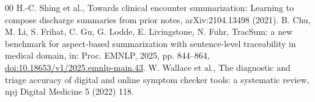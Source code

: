 \documentclass[preprint,12pt,a4paper]{elsarticle}
\begin{document}
\begin{thebibliography}{00}
 H.-C. Shing et al., Towards clinical encounter summarization: Learning to compose discharge summaries from prior notes, arXiv:2104.13498 (2021).
 B. Chu, M. Li, S. Frihat, C. Gu, G. Lodde, E. Livingstone, N. Fuhr, TracSum: a new benchmark for aspect-based summarization with sentence-level traceability in medical domain, in: Proc. EMNLP, 2025, pp. 844--864, \href{https://doi.org/10.18653/v1/2025.emnlp-main.43}{doi:10.18653/v1/2025.emnlp-main.43}.
 W. Wallace et al., The diagnostic and triage accuracy of digital and online symptom checker tools: a systematic review, npj Digital Medicine 5 (2022) 118.

\end{thebibliography}
\end{document}
